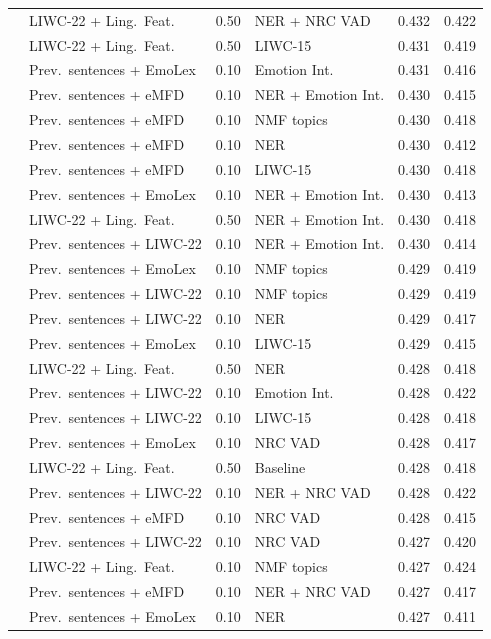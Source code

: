 {\begin{longtable}{llclcc}
 & LIWC-22 + Ling.\ Feat. & 0.50 & NER + NRC VAD & 0.432 & 0.422 \\
 & LIWC-22 + Ling.\ Feat. & 0.50 & LIWC-15 & 0.431 & 0.419 \\
 & Prev.\ sentences + EmoLex & 0.10 & Emotion Int. & 0.431 & 0.416 \\
 & Prev.\ sentences + eMFD & 0.10 & NER + Emotion Int. & 0.430 & 0.415 \\
 & Prev.\ sentences + eMFD & 0.10 & NMF topics & 0.430 & 0.418 \\
 & Prev.\ sentences + eMFD & 0.10 & NER & 0.430 & 0.412 \\
 & Prev.\ sentences + eMFD & 0.10 & LIWC-15 & 0.430 & 0.418 \\
 & Prev.\ sentences + EmoLex & 0.10 & NER + Emotion Int. & 0.430 & 0.413 \\
 & LIWC-22 + Ling.\ Feat. & 0.50 & NER + Emotion Int. & 0.430 & 0.418 \\
 & Prev.\ sentences + LIWC-22 & 0.10 & NER + Emotion Int. & 0.430 & 0.414 \\
 & Prev.\ sentences + EmoLex & 0.10 & NMF topics & 0.429 & 0.419 \\
 & Prev.\ sentences + LIWC-22 & 0.10 & NMF topics & 0.429 & 0.419 \\
 & Prev.\ sentences + LIWC-22 & 0.10 & NER & 0.429 & 0.417 \\
 & Prev.\ sentences + EmoLex & 0.10 & LIWC-15 & 0.429 & 0.415 \\
 & LIWC-22 + Ling.\ Feat. & 0.50 & NER & 0.428 & 0.418 \\
 & Prev.\ sentences + LIWC-22 & 0.10 & Emotion Int. & 0.428 & 0.422 \\
 & Prev.\ sentences + LIWC-22 & 0.10 & LIWC-15 & 0.428 & 0.418 \\
 & Prev.\ sentences + EmoLex & 0.10 & NRC VAD & 0.428 & 0.417 \\
 & LIWC-22 + Ling.\ Feat. & 0.50 & Baseline & 0.428 & 0.418 \\
 & Prev.\ sentences + LIWC-22 & 0.10 & NER + NRC VAD & 0.428 & 0.422 \\
 & Prev.\ sentences + eMFD & 0.10 & NRC VAD & 0.428 & 0.415 \\
 & Prev.\ sentences + LIWC-22 & 0.10 & NRC VAD & 0.427 & 0.420 \\
 & LIWC-22 + Ling.\ Feat. & 0.10 & NMF topics & 0.427 & 0.424 \\
 & Prev.\ sentences + eMFD & 0.10 & NER + NRC VAD & 0.427 & 0.417 \\
 & Prev.\ sentences + EmoLex & 0.10 & NER & 0.427 & 0.411 \\

\end{longtable}}
